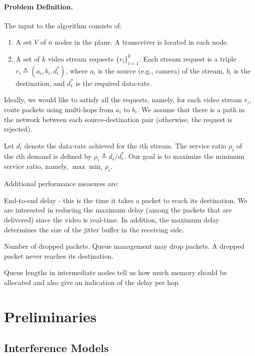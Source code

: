 \documentclass[12pt]{article}
\newenvironment{proof sketch}[1]{\noindent {\emph{Proof sketch of #1:}}}{\hfill \qed}
\newcommand{\eqdf}{\triangleq}
\begin{document}
\paragraph{Problem Definition.}
The input to the algorithm consists of:
\begin{enumerate}
\item A set $V$ of $n$ nodes in the plane. A transceiver is located in
  each node.
\item A set of $k$ video stream requests $\{r_i\}_{i=1}^k$. Each
  stream request is a triple $r_i\eqdf (a_i,b_i,d^*_i)$, where $a_i$ is
  the source (e.g., camera) of the stream, $b_i$ is the destination,
  and $d^*_i$ is the required data-rate.
\end{enumerate}
Ideally, we would like to satisfy all the requests, namely, for each
video stream $r_i$, route packets using multi-hops from $a_i$ to $b_i$.
We assume that there is a path in the network between each
source-destination pair (otherwise, the request is rejected).

Let $d_i$ denote the data-rate achieved for the $i$th stream.  The
service ratio $\rho_i$ of the $i$th demand is defined by $\rho_i \eqdf
d_i/d^*_i$.  Our goal is to maximize the minimum service ratio,
namely, $\max \min_i \rho_i$.

Additional performance measures are:
\begin{inparaenum}[(i)]
\item End-to-end delay - this is the time it takes a packet to reach
  its destination. We are interested in reducing the maximum delay
  (among the packets that are delivered) since the video is real-time.
  In addition, the maximum delay determines the size of the jitter
  buffer in the receiving side.
\item Number of dropped packets. Queue management may drop packets. A dropped packet
never reaches its destination.
\item Queue lengths in intermediate nodes tell us how much memory
  should be allocated and also give an indication of the delay per hop.
\end{inparaenum}

\section{Preliminaries}
\label{sec:prelim}

\subsection{Interference Models}\label{sec:models}
\end{document}
